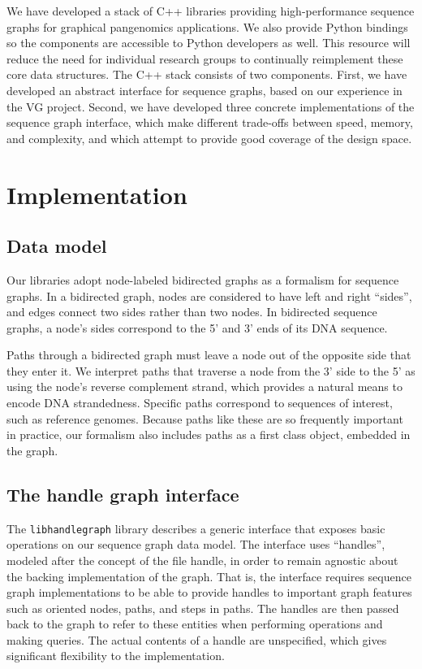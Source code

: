\documentclass{article}
\begin{document}
We have developed a stack of C++ libraries providing high-performance sequence graphs for graphical pangenomics applications. We also provide Python bindings so the components are accessible to Python developers as well. This resource will reduce the need for individual research groups to continually reimplement these core data structures. The C++ stack consists of two components. First, we have developed an abstract interface for sequence graphs, based on our experience in the VG project. Second, we have developed three concrete implementations of the sequence graph interface, which make different trade-offs between speed, memory, and complexity, and which attempt to provide good coverage of the design space. 

\section{Implementation}

\subsection{Data model}

Our libraries adopt node-labeled bidirected graphs as a formalism for sequence graphs. In a bidirected graph, nodes are considered to have left and right ``sides'', and edges connect two sides rather than two nodes. In bidirected sequence graphs, a node's sides correspond to the 5' and 3' ends of its DNA sequence. 

Paths through a bidirected graph must leave a node out of the opposite side that they enter it. We interpret paths that traverse a node from the 3' side to the 5' as using the node's reverse complement strand, which provides a natural means to encode DNA strandedness. Specific paths correspond to sequences of interest, such as reference genomes. Because paths like these are so frequently important in practice, our formalism also includes paths as a first class object, embedded in the graph.

\subsection{The handle graph interface}

The \texttt{libhandlegraph} library describes a generic interface that exposes basic operations on our sequence graph data model. The interface uses ``handles'', modeled after the concept of the file handle, in order to remain agnostic about the backing implementation of the graph. That is, the interface requires sequence graph implementations to be able to provide handles to important graph features such as oriented nodes, paths, and steps in paths. The handles are then passed back to the graph to refer to these entities when performing operations and making queries. The actual contents of a handle are unspecified, which gives significant flexibility to the implementation.
\end{document}
